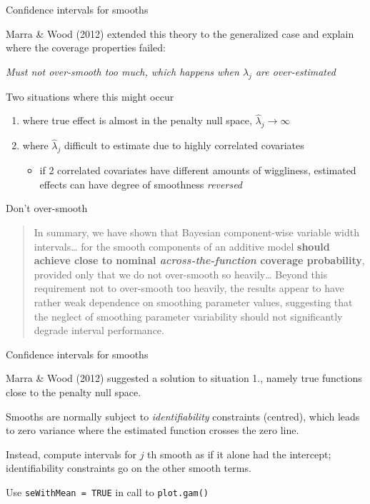 \documentclass[10pt,ignorenonframetext,compress, aspectratio=169]{beamer}
\providecommand{\tightlist}{%
  \setlength{\itemsep}{0pt}\setlength{\parskip}{0pt}}
\begin{document}
\begin{frame}{Confidence intervals for smooths}

Marra \& Wood (2012) extended this theory to the generalized case and
explain where the coverage properties failed:

\emph{Must not over-smooth too much, which happens when \(\lambda_j\)
are over-estimated}

Two situations where this might occur

\begin{enumerate}
\def\labelenumi{\arabic{enumi}.}
\tightlist
\item
  where true effect is almost in the penalty null space,
  \(\hat{\lambda}_j \rightarrow \infty\)
\item
  where \(\hat{\lambda}_j\) difficult to estimate due to highly
  correlated covariates

  \begin{itemize}
  \tightlist
  \item
    if 2 correlated covariates have different amounts of wiggliness,
    estimated effects can have degree of smoothness \emph{reversed}
  \end{itemize}
\end{enumerate}

\end{frame}

\begin{frame}{Don't over-smooth}

\begin{quote}
In summary, we have shown that Bayesian component-wise variable width
intervals\ldots{} for the smooth components of an additive model
\textbf{should achieve close to nominal \emph{across-the-function}
coverage probability}, provided only that we do not over-smooth so
heavily\ldots{} Beyond this requirement not to over-smooth too heavily,
the results appear to have rather weak dependence on smoothing parameter
values, suggesting that the neglect of smoothing parameter variability
should not significantly degrade interval performance.
\end{quote}

\end{frame}

\begin{frame}[fragile]{Confidence intervals for smooths}

Marra \& Wood (2012) suggested a solution to situation 1., namely true
functions close to the penalty null space.

Smooths are normally subject to \emph{identifiability} constraints
(centred), which leads to zero variance where the estimated function
crosses the zero line.

Instead, compute intervals for \(j\) th smooth as if it alone had the
intercept; identifiability constraints go on the other smooth terms.

Use \texttt{seWithMean\ =\ TRUE} in call to \texttt{plot.gam()}

\end{frame}
\end{document}
